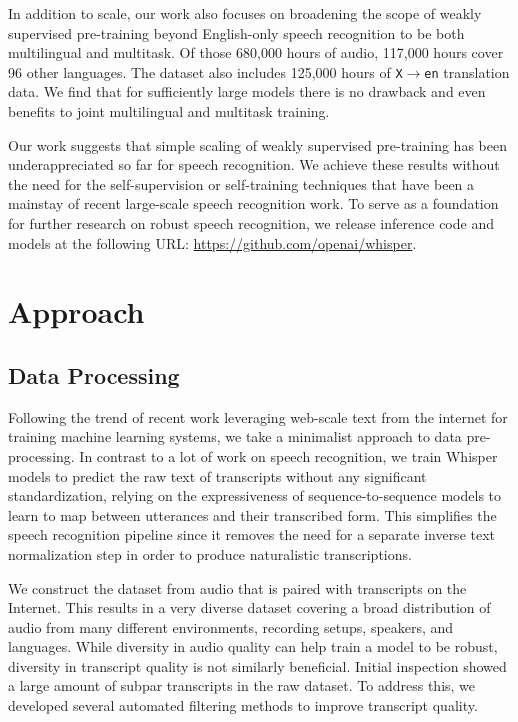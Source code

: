 \documentclass[nohyperref]{article}
\theoremstyle{plain}
\theoremstyle{definition}
\theoremstyle{remark}
\begin{document}
In addition to scale, our work also focuses on broadening the scope of weakly supervised pre-training beyond English-only speech recognition to be both multilingual and multitask. Of those 680,000 hours of audio, 117,000 hours cover 96 other languages. The dataset also includes 125,000 hours of \texttt{X$\rightarrow$en} translation data. We find that for sufficiently large models there is no drawback and even benefits to joint multilingual and multitask training.

Our work suggests that simple scaling of weakly supervised pre-training has been underappreciated so far for speech recognition. We achieve these results without the need for the self-supervision or self-training techniques that have been a mainstay of recent large-scale speech recognition work. To serve as a foundation for further research on robust speech recognition, we release inference code and models at the following URL: \url{https://github.com/openai/whisper}.

\section{Approach}\label{sec:approach}

\subsection{Data Processing}\label{subsec:data}

Following the trend of recent work leveraging web-scale text from the internet for training machine learning systems, we take a minimalist approach to data pre-processing. In contrast to a lot of work on speech recognition, we train Whisper models to predict the raw text of transcripts without any significant standardization, relying on the expressiveness of sequence-to-sequence models to learn to map between utterances and their transcribed form. This simplifies the speech recognition pipeline since it removes the need for a separate inverse text normalization step in order to produce naturalistic transcriptions. 

We construct the dataset from audio that is paired with transcripts on the Internet. This results in a very diverse dataset covering a broad distribution of audio from many different environments, recording setups, speakers, and languages. While diversity in audio quality can help train a model to be robust, diversity in transcript quality is not similarly beneficial. Initial inspection showed a large amount of subpar transcripts in the raw dataset. To address this, we developed several automated filtering methods to improve transcript quality. 
\end{document}
